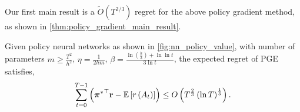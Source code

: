 Our first main result is a $\tilde{O}(T^{2/3})$ regret for the above policy gradient method, as shown in \cref{thm:policy_gradient_main_result}.
\begin{thm}
	\label{thm:policy_gradient_main_result}
	Given policy neural networks as shown in \cref{fig:nn_policy_value}, with number of parameters $m \ge \frac{T^2}{h^2}$, $\eta = \frac{1}{2 h m}$, $\beta = \frac{ \ln{\left(\frac{h}{3}\right) + \ln{\ln{t}} } }{ 3 \ln{t}}$, the expected regret of PGE satisfies,
	\begin{equation*}
	\begin{split}
	\sum\limits_{t=0}^{T-1}{ \left( {{\boldsymbol{\pi}}^*}^\top {\mathbf{r}} - {\mathbb{E}} \left[ r\left(A_t\right) \right] \right)} \le O\left(T^{\frac{2}{3}}\left( \ln{T} \right)^{\frac{1}{3}}\right).
	\end{split}
	\end{equation*}
\end{thm}

